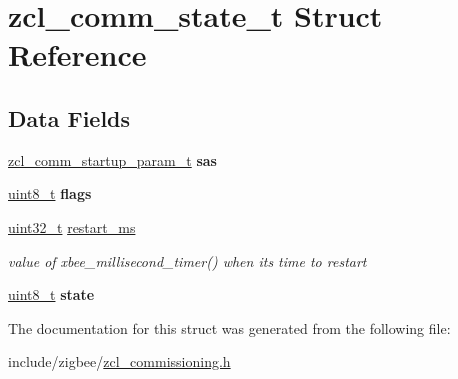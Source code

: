 \hypertarget{structzcl__comm__state__t}{}\section{zcl\+\_\+comm\+\_\+state\+\_\+t Struct Reference}
\label{structzcl__comm__state__t}
\subsection*{Data Fields}
\begin{DoxyCompactItemize}
\item 
\hyperlink{structzcl__comm__startup__param__t}{zcl\+\_\+comm\+\_\+startup\+\_\+param\+\_\+t} {\bfseries sas}
\item 
\hyperlink{group__hal__dos_gae1affc9ca37cfb624959c866a73f83c2}{uint8\+\_\+t} {\bfseries flags}
\item 
\hyperlink{group__hal__dos_ga09a1e304d66d35dd47daffee9731edaa}{uint32\+\_\+t} \hyperlink{group__zcl__commissioning_ga54811501883a7b2225b1a3111f86b760}{restart\+\_\+ms}
\begin{DoxyCompactList}\small\item\em value of xbee\+\_\+millisecond\+\_\+timer() when it\textquotesingle{}s time to restart \end{DoxyCompactList}\item 
\hyperlink{group__hal__dos_gae1affc9ca37cfb624959c866a73f83c2}{uint8\+\_\+t} {\bfseries state}
\end{DoxyCompactItemize}


The documentation for this struct was generated from the following file\+:\begin{DoxyCompactItemize}
\item 
include/zigbee/\hyperlink{zcl__commissioning_8h}{zcl\+\_\+commissioning.\+h}\end{DoxyCompactItemize}
